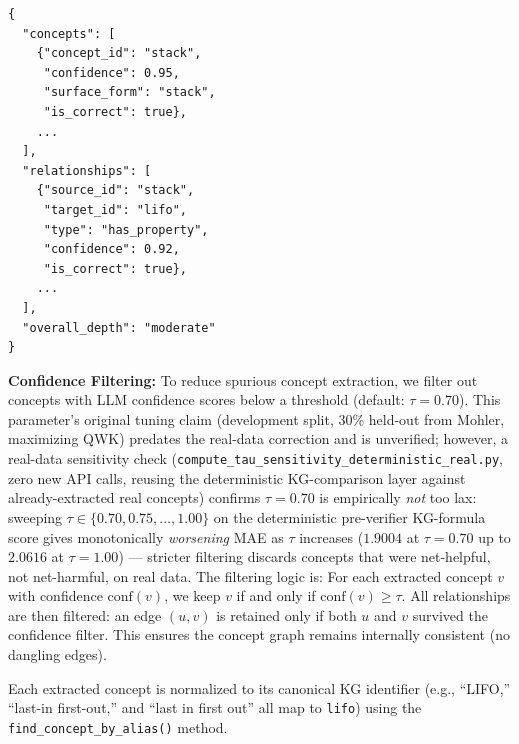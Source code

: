 \documentclass[conference]{IEEEtran}
\begin{document}
\begin{small}
\begin{verbatim}
{
  "concepts": [
    {"concept_id": "stack",
     "confidence": 0.95,
     "surface_form": "stack",
     "is_correct": true},
    ...
  ],
  "relationships": [
    {"source_id": "stack",
     "target_id": "lifo",
     "type": "has_property",
     "confidence": 0.92,
     "is_correct": true},
    ...
  ],
  "overall_depth": "moderate"
}
\end{verbatim}
\end{small}

\textbf{Confidence Filtering:} To reduce spurious concept extraction, we filter
out concepts with LLM confidence scores below a threshold (default: $\tau = 0.70$).
This parameter's original tuning claim (development split, 30\% held-out
from Mohler, maximizing QWK) predates the real-data correction and is
unverified; however, a real-data sensitivity check
(\texttt{compute\_tau\_sensitivity\_deterministic\_real.py}, zero new API
calls, reusing the deterministic KG-comparison layer against
already-extracted real concepts) confirms $\tau=0.70$ is empirically
\emph{not} too lax: sweeping $\tau \in \{0.70, 0.75, \ldots, 1.00\}$ on
the deterministic pre-verifier KG-formula score gives monotonically
\emph{worsening} MAE as $\tau$ increases ($1.9004$ at $\tau{=}0.70$ up to
$2.0616$ at $\tau{=}1.00$) --- stricter filtering discards concepts that
were net-helpful, not net-harmful, on real data. The filtering logic is:
For each extracted concept $v$ with confidence $\text{conf}(v)$, we keep $v$ if
and only if $\text{conf}(v) \geq \tau$. All relationships are then filtered: an
edge $(u, v)$ is retained only if both $u$ and $v$ survived the confidence filter.
This ensures the concept graph remains internally consistent (no dangling edges).

Each extracted concept is normalized to its canonical KG identifier (e.g.,
``LIFO,'' ``last-in first-out,'' and ``last in first out'' all map to
\texttt{lifo}) using the \texttt{find\_concept\_by\_alias()} method.
\end{document}
